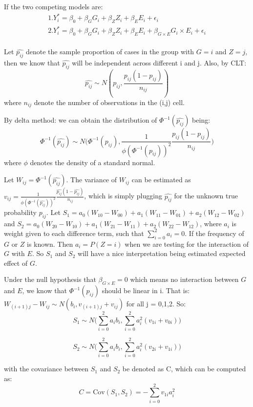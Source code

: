 \documentclass[]{article}
\begin{document}
If the two competing models are: \begin{equation}
\begin{aligned}
1. Y_i ^{*} = \beta_0 + \beta_G G_i + \beta_Z Z_i + \beta_E E_i + \epsilon_i \\
2. Y_i ^{*} = \beta_0 + \beta_G G_i + \beta_Z Z_i + \beta_E E_i + \beta_{G\times E}G_i \times E_i + \epsilon_i \\
\end{aligned}
\end{equation}

Let \(\hat{p_{ij}}\) denote the sample proportion of cases in the group
with \(G = i\) and \(Z = j\), then we know that \(\hat{p_{ij}}\) will be
independent across different i and j. Also, by CLT:
\[\hat{p_{ij}} \sim N(p_{ij},\frac{p_{ij}(1-p_{ij})}{n_{ij}})\] where
\(n_{ij}\) denote the number of observations in the (i,j) cell.

By delta method: we can obtain the distribution of
\(\Phi^{-1}(\hat{p_{ij}})\) being:
\[\Phi^{-1}(\hat{p_{ij}}) \sim N\bigg(\Phi^{-1}(p_{ij}),\frac{1}{\phi(\Phi^{-1}(p_{ij}))^2}\frac{p_{ij}(1-p_{ij})}{n_{ij}}\bigg)\]
where \(\phi\) denotes the density of a standard normal.

Let \(W_{ij} = \Phi^{-1}(\hat{p_{ij}})\). The variance of \(W_{ij}\) can
be estimated as
\(v_{ij} = \frac{1}{\phi(\Phi^{-1}(\hat{p_{ij}}))^2}\frac{\hat{p_{ij}}(1-\hat{p_{ij}})}{n_{ij}}\),
which is simply plugging \(\hat{p_{ij}}\) for the unknown true
probability \(p_{ij}\). Let
\(S_1 = a_0(W_{10}-W_{00}) + a_1(W_{11}-W_{01}) + a_2(W_{12}-W_{02})\)
and
\(S_2 = a_0(W_{20}-W_{10}) + a_1(W_{21}-W_{11}) + a_2(W_{22}-W_{12})\),
where \(a_i\) is weight given to each difference term, such that
\(\sum_{i=0}^2 a_i =0\). If the frequency of \(G\) or \(Z\) is known.
Then \(a_i = P(Z =i)\) when we are testing for the interaction of \(G\)
with \(E\). So \(S_1\) and \(S_2\) will have a nice interpretation being
estimated expected effect of \(G\).

Under the null hypothesis that \(\beta_{G\times E} =0\) which means no
interaction between \(G\) and \(E\), we know that \(\Phi^{-1}(p_{ij})\)
should be linear in i. That is:
\(W_{(i+1)j} - W_{ij} \sim N(b_i,v_{(i+1)j} + v_{ij})\) for all j =
0,1,2. So:
\[S_1 \sim N\bigg(\sum_{i=0}^{2}a_ib_i,\sum_{i=0}^{2}a_i^2(v_{1i}+v_{0i})\bigg) \]

\[S_2 \sim N\bigg(\sum_{i=0}^{2}a_ib_i,\sum_{i=0}^{2}a_i^2(v_{2i}+v_{1i})\bigg) \]

with the covariance between \(S_1\) and \(S_2\) be denoted as C, which
can be computed as:
\[ C = \text{Cov}(S_1,S_2) = -\sum_{i=0}^{2}v_{1i}a_i^2 \]
\end{document}
